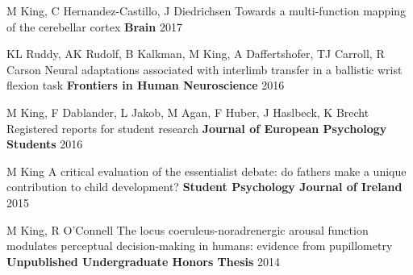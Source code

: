 \begin{cventries}
  \cventry
    {M King, C Hernandez-Castillo, J Diedrichsen} %
    {Towards a multi-function mapping of the cerebellar cortex} %
    {\textbf{Brain}} %
    {2017} %
    {}
    
  \cventry
    {KL Ruddy, AK Rudolf, B Kalkman, M King, A Daffertshofer, TJ Carroll, R Carson} %
    {Neural adaptations associated with interlimb transfer in a ballistic wrist flexion task} %
    {\textbf{Frontiers in Human Neuroscience}} %
    {2016} %
    {}
    
  \cventry
    {M King, F Dablander, L Jakob, M Agan, F Huber, J Haslbeck, K Brecht} %
    {Registered reports for student research} %
    {\textbf{Journal of European Psychology Students}} %
    {2016} %
    {}
    
  \cventry
    {M King} %
    {A critical evaluation of the essentialist debate: do fathers make a unique contribution to child development?} %
    {\textbf{Student Psychology Journal of Ireland}} %
    {2015} %
    {}
    
  \cventry
    {M King, R O'Connell} %
    {The locus coeruleus-noradrenergic arousal function modulates perceptual decision-making in humans: evidence from pupillometry} %
    {\textbf{Unpublished Undergraduate Honors Thesis}} %
    {2014} %
    {}

\end{cventries}
